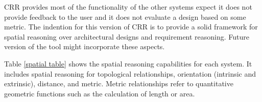 \documentclass[12pt]{ucthesis}
\begin{document}
\begin{table}[H]
  \begin{center}
  \end{center}
\caption{Functionality}
\label{functionality table}
\end{table} 

CRR provides most of the functionality of the other systems expect it does not provide feedback to the user and it does not evaluate a design based on some metric. The indention for this version of CRR is to provide a solid framework for spatial reasoning over architectural designs and requirement reasoning. Future version of the tool might incorporate these aspects. 

Table \ref{spatial table} shows the spatial reasoning capabilities for each system. It includes spatial reasoning for topological relationships, orientation (intrinsic and extrinsic), distance, and metric. Metric relationships refer to quantitative geometric functions such as the calculation of length or area.  

\begin{table}[H]
  \begin{center}
  \end{center}
\caption{Types of Spatial Reasoning}
\label{spatial table}
\end{table}
\end{document}
